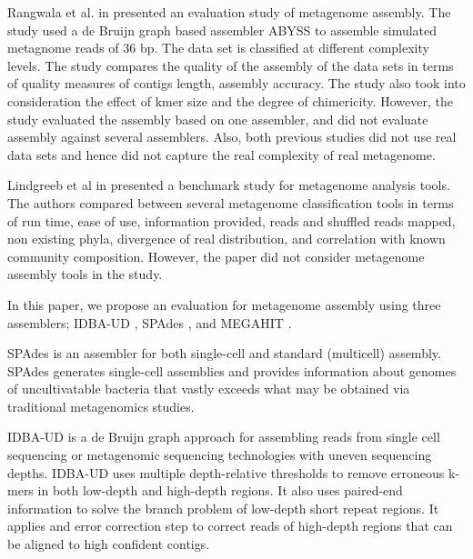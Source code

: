 \documentclass[10pt,a4paper,twocolumn]{article}
\begin{document}
Rangwala et al. in \cite{huzefa2011} presented an evaluation study of metagenome assembly. The study used a de Bruijn graph based assembler ABYSS \cite{abyss}  to assemble simulated metagnome reads of 36 bp. The data set is classified at different complexity levels. 
The study compares the quality of the assembly of the data sets in terms of quality measures of contigs length, assembly accuracy. The study also took into consideration the effect of kmer size and the degree of chimericity. 
However, the study evaluated the assembly based on one assembler, and did not evaluate assembly against several assemblers. 
Also, both previous studies did not use real data sets and hence did not capture the real complexity of real metagenome. 
 
 Lindgreeb et al in \cite{metaclass} presented a benchmark study for metagenome analysis tools. The authors compared between several metagenome classification tools  in terms of run time,  ease of use, information provided, reads and shuffled reads mapped, non existing phyla, divergence of real distribution, and correlation with known community composition. However, the paper did not consider metagenome assembly tools in the study. 
 
 
In this paper, we propose an evaluation for metagenome assembly using three assemblers;  IDBA-UD \cite{idba},  SPAdes \cite {spades}, and MEGAHIT \cite{megahit} . 


SPAdes \cite{spades} is an assembler for both single-cell and standard (multicell) assembly. SPAdes generates single-cell assemblies and provides information about genomes of uncultivatable bacteria that vastly exceeds what may be obtained via traditional metagenomics studies. 

IDBA-UD \cite{idba} is a de Bruijn graph approach for assembling reads from single cell sequencing or metagenomic sequencing technologies with uneven sequencing depths. IDBA-UD uses multiple depth-relative thresholds to remove erroneous k-mers in both low-depth and high-depth regions. It also uses paired-end information  to solve the branch problem of low-depth short repeat regions. It applies and error correction step to correct reads of high-depth regions that can be aligned to high confident contigs.
\end{document}
